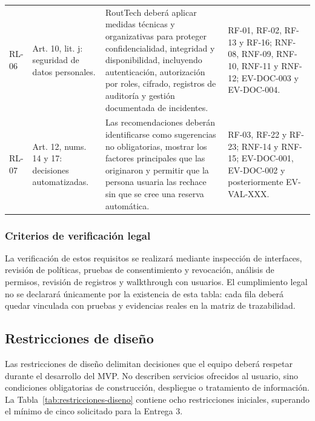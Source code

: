 \documentclass[12pt,a4paper]{article}
\begin{document}
\begin{longtable}{C{1.35cm} L{2.25cm} L{5.75cm} L{4.25cm}}
RL-06 & Art. 10, lit. j: seguridad de datos personales. & RoutTech deberá aplicar medidas técnicas y organizativas para proteger confidencialidad, integridad y disponibilidad, incluyendo autenticación, autorización por roles, cifrado, registros de auditoría y gestión documentada de incidentes. & RF-01, RF-02, RF-13 y RF-16; RNF-08, RNF-09, RNF-10, RNF-11 y RNF-12; EV-DOC-003 y EV-DOC-004.\\
RL-07 & Art. 12, nums. 14 y 17: decisiones automatizadas. & Las recomendaciones deberán identificarse como sugerencias no obligatorias, mostrar los factores principales que las originaron y permitir que la persona usuaria las rechace sin que se cree una reserva automática. & RF-03, RF-22 y RF-23; RNF-14 y RNF-15; EV-DOC-001, EV-DOC-002 y posteriormente EV-VAL-XXX.\\
\end{longtable}

\subsubsection{Criterios de verificación legal}

La verificación de estos requisitos se realizará mediante inspección de interfaces, revisión de políticas, pruebas de consentimiento y revocación, análisis de permisos, revisión de registros y walkthrough con usuarios. El cumplimiento legal no se declarará únicamente por la existencia de esta tabla: cada fila deberá quedar vinculada con pruebas y evidencias reales en la matriz de trazabilidad.

\subsection{Restricciones de diseño}

Las restricciones de diseño delimitan decisiones que el equipo deberá respetar durante el desarrollo del MVP. No describen servicios ofrecidos al usuario, sino condiciones obligatorias de construcción, despliegue o tratamiento de información. La Tabla~\ref{tab:restricciones-diseno} contiene ocho restricciones iniciales, superando el mínimo de cinco solicitado para la Entrega 3.
\end{document}
